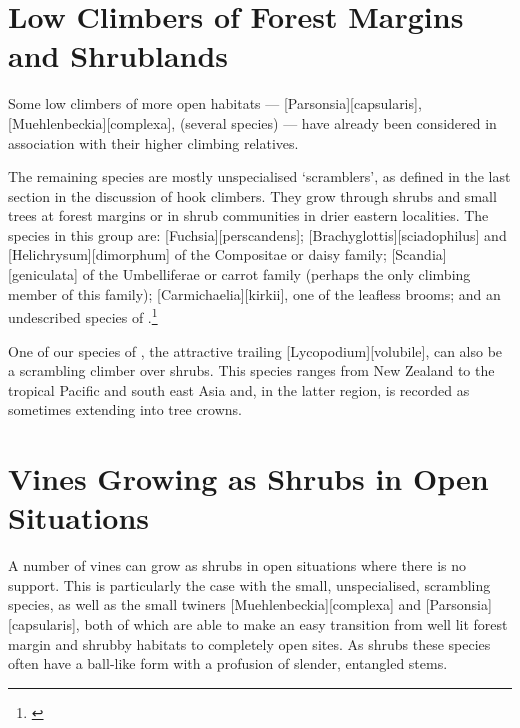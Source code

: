 \section{Low Climbers of Forest Margins and Shrublands}

Some low climbers of more open habitats --- [Parsonsia][capsularis], [Muehlenbeckia][complexa],  (several species) --- have already been considered in association with their higher climbing relatives.

The remaining species are mostly unspecialised `scramblers', as defined in the last section in the discussion of hook climbers.
They grow through shrubs and small trees at forest margins or in shrub communities in drier eastern localities.
The species in this group are: [Fuchsia][perscandens]; [Brachyglottis][sciadophilus] and [Helichrysum][dimorphum] of the Compositae or daisy family; [Scandia][geniculata] of the Umbelliferae or carrot family (perhaps the only climbing member of this family); [Carmichaelia][kirkii], one of the leafless brooms; and an undescribed species of .\footnote{\cite{eagle1982trees}}

One of our species of , the attractive trailing [Lycopodium][volubile], can also be a scrambling climber over shrubs.
This species ranges from New Zealand to the tropical Pacific and south east Asia and, in the latter region, is recorded as sometimes extending into tree crowns.

\section{Vines Growing as Shrubs in Open Situations}

A number of vines can grow as shrubs in open situations where there is no support.
This is particularly the case with the small, unspecialised, scrambling species, as well as the small twiners [Muehlenbeckia][complexa] and [Parsonsia][capsularis], both of which are able to make an easy transition from well lit forest margin and shrubby habitats to completely open sites.
As shrubs these species often have a ball-like form with a profusion of slender, entangled stems.

